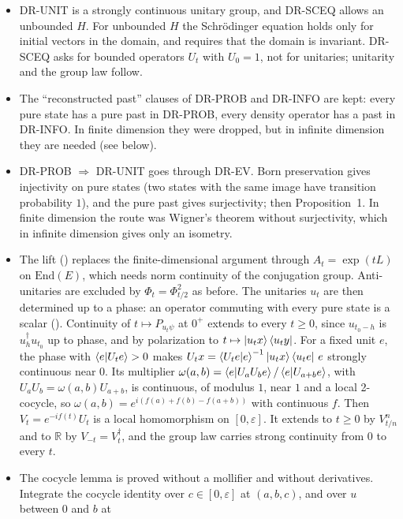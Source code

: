 \documentclass[11pt]{article}
\begin{document}
\begin{itemize}
  only on pure states.
\item DR-UNIT is a strongly continuous unitary group, and DR-SCEQ allows an unbounded $H$. For
  unbounded $H$ the Schr\"odinger equation holds only for initial vectors in the domain, and
   requires that the domain is invariant. DR-SCEQ asks for bounded
  operators $U_t$ with $U_0 = 1$, not for unitaries; unitarity and the group law follow.
\item The ``reconstructed past'' clauses of DR-PROB and DR-INFO are kept: every pure state has a
  pure past in DR-PROB, every density operator has a past in DR-INFO. In finite dimension they
  were dropped, but in infinite dimension they are needed (see below).
\item DR-PROB $\Rightarrow$ DR-UNIT goes through DR-EV. Born preservation gives injectivity on
  pure states (two states with the same image have transition probability $1$), and the pure past
  gives surjectivity; then Proposition~1. In finite dimension the route was Wigner's theorem
  without surjectivity, which in infinite dimension gives only an isometry.
\item The lift () replaces the finite-dimensional
  argument through $A_t = \exp(tL)$ on $\mathrm{End}(E)$, which needs norm continuity of the
  conjugation group. Anti-unitaries are excluded by $\Phi_t = \Phi_{t/2}^2$ as before. The
  unitaries $u_t$ are then determined up to a phase: an operator commuting with every pure state
  is a scalar (). Continuity of $t \mapsto P_{u_t\psi}$ at $0^+$
  extends to every $t \ge 0$, since $u_{t_0-h}$ is $u_h^\dagger u_{t_0}$ up to phase, and by
  polarization to $t \mapsto \ket{u_tx}\bra{u_ty}$. For a fixed unit $e$, the phase with
  $\braket{e|U_te} > 0$ makes $U_tx = \braket{U_te|e}^{-1}\ket{u_tx}\bra{u_te}\,e$ strongly
  continuous near $0$. Its multiplier $\omega(a,b) = \braket{e|U_aU_be}/\braket{e|U_{a+b}e}$,
  with $U_aU_b = \omega(a,b)U_{a+b}$, is continuous, of modulus $1$, near $1$ and a local
  2-cocycle, so $\omega(a,b) = e^{i(f(a)+f(b)-f(a+b))}$ with continuous $f$. Then
  $V_t = e^{-if(t)}U_t$ is a local homomorphism on $[0,\varepsilon]$. It extends to $t \ge 0$ by
  $V_{t/n}^n$ and to $\mathbb{R}$ by $V_{-t} = V_t^\dagger$, and the group law carries strong
  continuity from $0$ to every $t$.
\item The cocycle lemma is proved without a mollifier and without derivatives. Integrate the
  cocycle identity over $c \in [0,\varepsilon]$ at $(a,b,c)$, and over $u$ between $0$ and $b$ at

\end{itemize}
\end{document}
